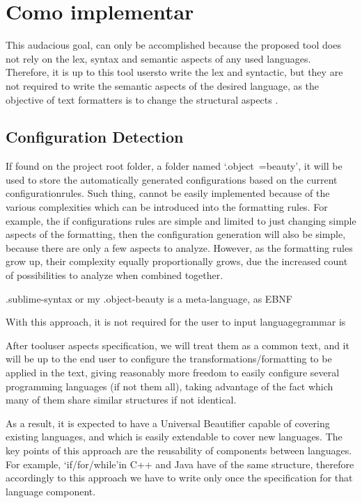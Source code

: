 \section{Como implementar}

This audacious goal,
can only be accomplished because the proposed tool does not rely on the lex,
syntax and semantic aspects
of any used languages.
Therefore,
it is up to this tool users\s to write the lex and syntactic,
but they are not required to write the semantic aspects of the desired language,
as the objective of text formatters is to change the structural aspects
.


\subsection{Configuration Detection}

If found on the project root folder,
a folder named `.object~=beauty',
it will be used to store the automatically generated configurations based on the current configuration\s rules.
Such thing,
cannot be easily implemented because of the various complexities which can be introduced into the formatting rules.
For example,
the if configurations rules are simple and
limited to just changing simple aspects of the formatting,
then the configuration generation will also be simple,
because there are only a few aspects to analyze.
However,
as the formatting rules grow up,
their complexity equally proportionally grows,
due the increased count of possibilities to analyze when combined together.


.sublime-syntax or my .object-beauty is a meta-language, as EBNF

With this approach, it is not required for the user to input language\s grammar is

 After tool\s user aspects specification, we will treat them as a common text,
and it will be up to the end user to configure the transformations/formatting to be applied in the text,
giving reasonably more freedom to easily configure several programming languages (if not them all),
taking advantage of the fact which many of them share similar structures if not identical.

As a result, it is expected to have a Universal Beautifier capable of
covering existing languages, and which is easily extendable to cover new
languages. The key points of this approach are the reusability of components
between languages. For example, `if/for/while'\s in C++ and Java have of the
same structure, therefore accordingly to this approach we have to write only
once the specification for that language component.


